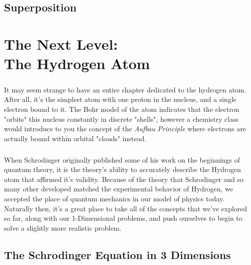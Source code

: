 \documentclass[12pt,letterpaper]{book}
\begin{document}

\section{Superposition}



\chapter{The Next Level: \\ The Hydrogen Atom}
\paragraph*{}It may seem strange to have an entire chapter dedicated to the hydrogen atom. After all, it's the simplest atom with one proton in the nucleus, and a single electron bound to it. The Bohr model of the atom indicates that the electron "orbits" this nucleus constantly in discrete "shells", however a chemistry class would introduce to you the concept of the \textit{Aufbau Principle} where electrons are actually bound within orbital "clouds" instead.
\paragraph*{}When Schrodinger originally published some of his work on the beginnings of quantum theory, it is the theory's ability to accurately describe the Hydrogen atom that affirmed it's validity. Because of the theory that Schrodinger and so many other developed matched the experimental behavior of Hydrogen, we accepted the place of quantum mechanics in our model of physics today. Naturally then, it's a great place to take all of the concepts that we've explored so far, along with our 1-Dimensional problems, and push ourselves to begin to solve a slightly more realistic problem. 


\section{The Schrodinger Equation in 3 Dimensions}
\end{document}
